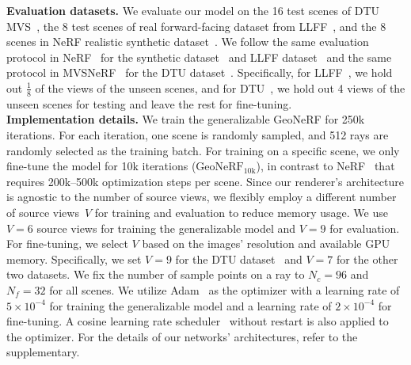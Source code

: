 \noindent\textbf{Evaluation datasets.} We evaluate our model on the 16 test scenes of DTU MVS~\cite{jensen2014large}, the 8 test scenes of real forward-facing dataset from LLFF~\cite{mildenhall2019llff}, and the 8 scenes in NeRF realistic synthetic dataset~\cite{mildenhall2020nerf}. We follow the same evaluation protocol in NeRF~\cite{mildenhall2020nerf} for the synthetic dataset~\cite{mildenhall2020nerf} and LLFF dataset~\cite{mildenhall2019llff} and the same protocol in MVSNeRF~\cite{chen2021mvsnerf} for the DTU dataset~\cite{jensen2014large}. Specifically, for LLFF~\cite{mildenhall2019llff}, we hold out $\frac{1}{8}$ of the views of the unseen scenes, and for DTU~\cite{jensen2014large}, we hold out 4 views of the unseen scenes for testing and leave the rest for fine-tuning.\\

\noindent\textbf{Implementation details.} We train the generalizable GeoNeRF for 250k iterations. For each iteration, one scene is randomly sampled, and 512 rays are randomly selected as the training batch. For training on a specific scene, we only fine-tune the model for 10k iterations ($\text{GeoNeRF}_{\text{10k}}$), in contrast to NeRF~\cite{mildenhall2020nerf} that requires 200k$\textrm{--}$500k optimization steps per scene. Since our renderer's architecture is agnostic to the number of source views, we flexibly employ a different number of source views~$V$ for training and evaluation to reduce memory usage. We use $V=6$ source views for training the generalizable model and $V=9$ for evaluation. For fine-tuning, we select $V$ based on the images' resolution and available GPU memory. Specifically, we set $V=9$ for the DTU dataset~\cite{jensen2014large} and $V=7$ for the other two datasets. We fix the number of sample points on a ray to $N_{c} = 96$ and $N_{f} = 32$ for all scenes. We utilize Adam~\cite{adam} as the optimizer with a learning rate of $5 \times 10^{-4}$ for training the generalizable model and a learning rate of $2 \times 10^{-4}$ for fine-tuning. A cosine learning rate scheduler~\cite{sgdr} without restart is also applied to the optimizer. For the details of our networks' architectures, refer to the supplementary.

